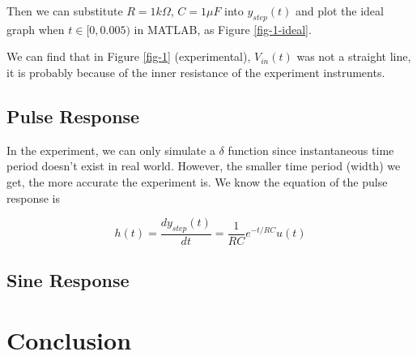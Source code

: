 \documentclass{article}
\begin{document}
Then we can substitute $R=1k\Omega$, $C=1\mu F$ into $y_{step}(t)$ and plot the ideal graph when $t\in[0,0.005)$ in MATLAB, as Figure \ref{fig-1-ideal}.

We can find that in Figure \ref{fig-1} (experimental), $V_{in}(t)$ was not a straight line, it is probably because of the inner resistance of the experiment instruments.

\subsection{Pulse Response}
In the experiment, we can only simulate a $\delta$ function since instantaneous time period doesn't exist in real world. However, the smaller time period (width) we get, the more accurate the experiment is. We know the equation of the pulse response is

$$h(t)=\frac{dy_{step}(t)}{dt}=\frac{1}{RC}e^{-t/RC}u(t)$$

\subsection{Sine Response}

\section{Conclusion}
\end{document}
